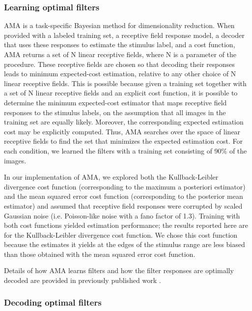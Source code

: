 \documentclass{jov}
\begin{document}
\subsubsection*{Learning optimal filters}
AMA is a task-specific Bayesian method for dimensionality reduction.
When provided with a labeled training set, a receptive field response model, a decoder that uses these responses to estimate the stimulus label, and a cost function, AMA returns a set of N linear receptive fields, where N is a parameter of the procedure.
These receptive fields are chosen so that decoding their responses leads to minimum expected-cost estimation, relative to any other choice of N linear receptive fields.
This is possible because given a training set together with a set of N linear receptive fields and an explicit cost function, it is possible to determine the minimum expected-cost estimator that maps receptive field responses to the stimulus labels, on the assumption that all images in the training set are equally likely.
Moreover, the corresponding expected estimation cost may be explicitly computed.
Thus, AMA searches over the space of linear receptive fields to find the set that minimizes the expected estimation cost.
For each condition, we learned the filters with a training set consisting of 90\% of the images.

In our implementation of AMA, we explored both the Kullback-Leibler divergence cost function (corresponding to the maximum a posteriori estimator) and the mean squared error cost function (corresponding to the posterior mean estimator) and assumed that receptive field responses were corrupted by scaled Gaussian noise (i.e. Poisson-like noise with a fano factor of 1.3).
Training with both cost functions yielded estimation performance; the results reported here are for the Kullback-Leibler divergence cost function.
We chose this cost function because the estimates it yields at the edges of the stimulus range are less biased than those obtained with the mean squared error cost function.

Details of how AMA learns filters and how the filter responses are optimally decoded are provided in previously published work \cite{geisler2009optimal,burge2017accuracy,jaini2017linking}.

\subsubsection*{Decoding optimal filters}
\end{document}
